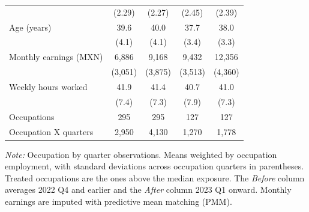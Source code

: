 \begin{table}[H]
\begin{threeparttable}
\begin{tabular}[t]{lcccc}
                                     & (2.29)                      & (2.27)                      & (2.45)      & (2.39)      \\
      \addlinespace[3pt]
      Age (years)                    & 39.6                        & 40.0                        & 37.7        & 38.0        \\
                                     & (4.1)                       & (4.1)                       & (3.4)       & (3.3)       \\
      \addlinespace[3pt]
      Monthly earnings (MXN)         & 6,886                       & 9,168                       & 9,432       & 12,356      \\
                                     & (3,051)                     & (3,875)                     & (3,513)     & (4,360)     \\
      \addlinespace[3pt]
      Weekly hours worked            & 41.9                        & 41.4                        & 40.7        & 41.0        \\
                                     & (7.4)                       & (7.3)                       & (7.9)       & (7.3)       \\
      \midrule
      Occupations                    & 295                         & 295                         & 127         & 127         \\
      Occupation X quarters          & 2,950                       & 4,130                       & 1,270       & 1,778       \\
      \bottomrule
    \end{tabular}
    \begin{tablenotes}
      \item \textit{Note: } Occupation by quarter observations. Means weighted by occupation employment, with standard deviations across occupation quarters in parentheses. Treated occupations are the ones above the median exposure. The \textit{Before} column averages 2022 Q4 and earlier and the \textit{After} column 2023 Q1 onward. Monthly earnings are imputed with predictive mean matching (PMM).
    \end{tablenotes}
  \end{threeparttable}
\end{table}

